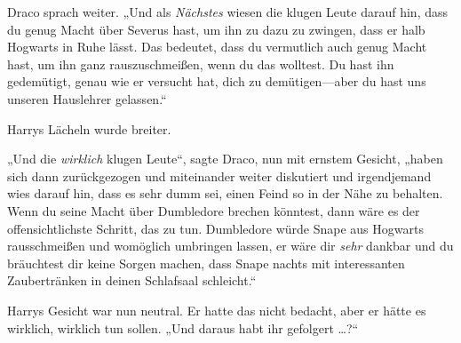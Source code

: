 Draco sprach weiter. „Und als \emph{Nächstes} wiesen die klugen Leute darauf hin, dass du genug Macht über Severus hast, um ihn zu dazu zu zwingen, dass er halb Hogwarts in Ruhe lässt. Das bedeutet, dass du vermutlich auch genug Macht hast, um ihn ganz rauszuschmeißen, wenn du das wolltest. Du hast ihn gedemütigt, genau wie er versucht hat, dich zu demütigen—aber du hast uns unseren Hauslehrer gelassen.“

Harrys Lächeln wurde breiter.

„Und die \emph{wirklich} klugen Leute“, sagte Draco, nun mit ernstem Gesicht, „haben sich dann zurückgezogen und miteinander weiter diskutiert und irgendjemand wies darauf hin, dass es sehr dumm sei, einen Feind so in der Nähe zu behalten. Wenn du seine Macht über Dumbledore brechen könntest, dann wäre es der offensichtlichste Schritt, das zu tun. Dumbledore würde Snape aus Hogwarts rausschmeißen und womöglich umbringen lassen, er wäre dir \emph{sehr} dankbar und du bräuchtest dir keine Sorgen machen, dass Snape nachts mit interessanten Zaubertränken in deinen Schlafsaal schleicht.“

Harrys Gesicht war nun neutral. Er hatte das nicht bedacht, aber er hätte es wirklich, wirklich tun sollen. „Und daraus habt ihr gefolgert …?“

